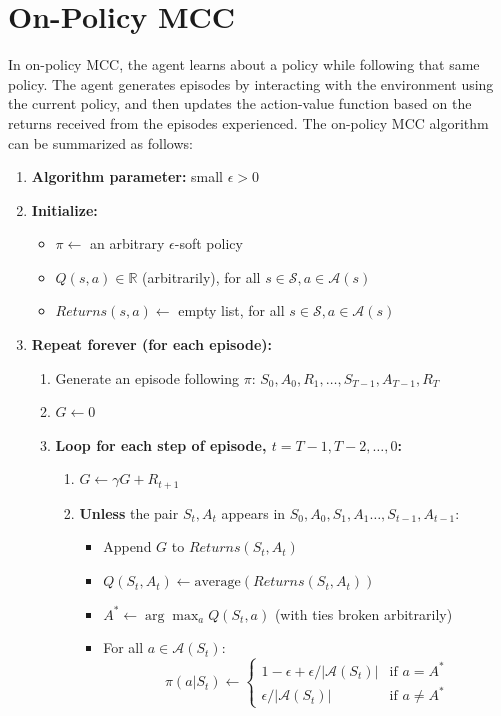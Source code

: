 \documentclass{article}
\begin{document}
\section{On-Policy MCC}
In on-policy MCC, the agent learns about a policy while following that same policy. The agent generates episodes by interacting with the environment using the current policy, and then updates the action-value function based on the returns received from the episodes experienced. The on-policy MCC algorithm can be summarized as follows:
\begin{enumerate}
    \item \textbf{Algorithm parameter:} small $\epsilon > 0$
    \item \textbf{Initialize:}
    \begin{itemize}
        \item $\pi \leftarrow$ an arbitrary $\epsilon$-soft policy
        \item $Q(s, a) \in \mathbb{R}$ (arbitrarily), for all $s \in \mathcal{S}, a \in \mathcal{A}(s)$
        \item $Returns(s, a) \leftarrow$ empty list, for all $s \in \mathcal{S}, a \in \mathcal{A}(s)$
    \end{itemize}
    \item \textbf{Repeat forever (for each episode):}
    \begin{enumerate}
        \item Generate an episode following $\pi$: $S_0, A_0, R_1, \dots, S_{T-1}, A_{T-1}, R_T$
        \item $G \leftarrow 0$
        \item \textbf{Loop for each step of episode, $t = T-1, T-2, \dots, 0$:}
        \begin{enumerate}
            \item $G \leftarrow \gamma G + R_{t+1}$
            \item \textbf{Unless} the pair $S_t, A_t$ appears in $S_0, A_0, S_1, A_1 \dots, S_{t-1}, A_{t-1}$:
            \begin{itemize}
                \item Append $G$ to $Returns(S_t, A_t)$
                \item $Q(S_t, A_t) \leftarrow \text{average}(Returns(S_t, A_t))$
                \item $A^* \leftarrow \arg\max_a Q(S_t, a)$ \hfill (with ties broken arbitrarily)
                \item For all $a \in \mathcal{A}(S_t)$:
                \[
                \pi(a|S_t) \leftarrow 
                \begin{cases} 
                1 - \epsilon + \epsilon/|\mathcal{A}(S_t)| & \text{if } a = A^* \\
                \epsilon/|\mathcal{A}(S_t)| & \text{if } a \neq A^*
                \end{cases}
                \]
            \end{itemize}
        \end{enumerate}
    \end{enumerate}
\end{enumerate}
\end{document}
